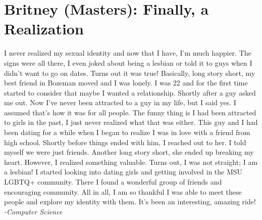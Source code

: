 \section*{Britney (Masters): Finally, a Realization}
I never realized my sexual identity and now that I have, I’m much happier. 
The signs were all there, I even joked about being a lesbian or told it to 
guys when I didn’t want to go on dates. Turns out it was true! Basically, long 
story short, my best friend in Bozeman moved and I was lonely. I was 22 and for
the first time started to consider that maybe I wanted a relationship. Shortly 
after a guy asked me out. Now I’ve never been attracted to a guy in my life, 
but I said yes. I assumed that’s how it was for all people. The funny thing is 
I had been attracted to girls in the past, I just never realized what that was 
either. This guy and I had been dating for a while when I began to realize I 
was in love with a friend from high school. Shortly before things ended with 
him, I reached out to her. I told myself we were just friends. Another long 
story short, she ended up breaking my heart. However, I realized something 
valuable. Turns out, I was not straight; I am a lesbian! I started looking into 
dating girls and getting involved in the MSU LGBTQ+ community. There I found a 
wonderful group of friends and encouraging community. All in all, I am so 
thankful I was able to meet these people and explore my identity with them. 
It’s been an interesting, amazing ride! \\
\textit{-Computer Science}
